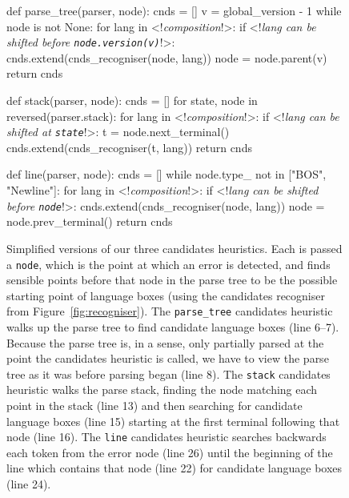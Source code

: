 \documentclass[sigplan,screen]{acmart}\settopmatter{printfolios=true,printccs=false,printacmref=false}
\begin{document}
\begin{figure}[t]
\begin{minipage}[t]{0.55\textwidth}
\begin{lstdefault}[]
def parse_tree(parser, node):
  cnds = []
  v = global_version - 1
  while node is not None:
    for lang in <!\textrm{\textit{composition}}!>:
      if <!\textrm{\textit{lang can be shifted before \texttt{node.version(v)}}}!>:
        cnds.extend(cnds_recogniser(node, lang))
    node = node.parent(v)
  return cnds

def stack(parser, node):
  cnds = []
  for state, node in reversed(parser.stack):
    for lang in <!\textrm{\textit{composition}}!>:
      if <!\textrm{\textit{lang can be shifted at \texttt{state}}}!>:
        t = node.next_terminal()
        cnds.extend(cnds_recogniser(t, lang))
  return cnds

def line(parser, node):
  cnds = []
  while node.type_ not in ["BOS", "Newline"]:
    for lang in <!\textrm{\textit{composition}}!>:
      if <!\textrm{\textit{lang can be shifted before \texttt{node}}}!>:
        cnds.extend(cnds_recogniser(node, lang))
    node = node.prev_terminal()
  return cnds
\end{lstdefault}
\end{minipage}
\begin{minipage}[t]{0.44\textwidth}
  \caption{Simplified versions of our three candidates heuristics. Each is
  passed a \texttt{node}, which is the point at which an error is detected, and
finds sensible points before that node in the parse tree to be the possible
starting point of language boxes (using the candidates recogniser from
Figure~\ref{fig:recogniser}).
The \texttt{parse\_tree} candidates heuristic
walks up the parse tree to find candidate language boxes (line 6--7).
Because the parse tree is, in a sense, only partially parsed at the point the
candidates heuristic is called, we have to view the parse tree as it was before parsing
began (line 8).
The \texttt{stack} candidates heuristic walks the parse
stack, finding the node matching each point in the stack (line 13) and then
searching for candidate language boxes (line 15) starting at the first terminal
following that node (line 16).
The \texttt{line} candidates heuristic searches
backwards each token from the error node (line 26) until the beginning of
the line which contains that node (line 22) for
candidate language boxes (line 24).}
\label{lst:find_candidates}
\end{minipage}
\end{figure}
\end{document}
